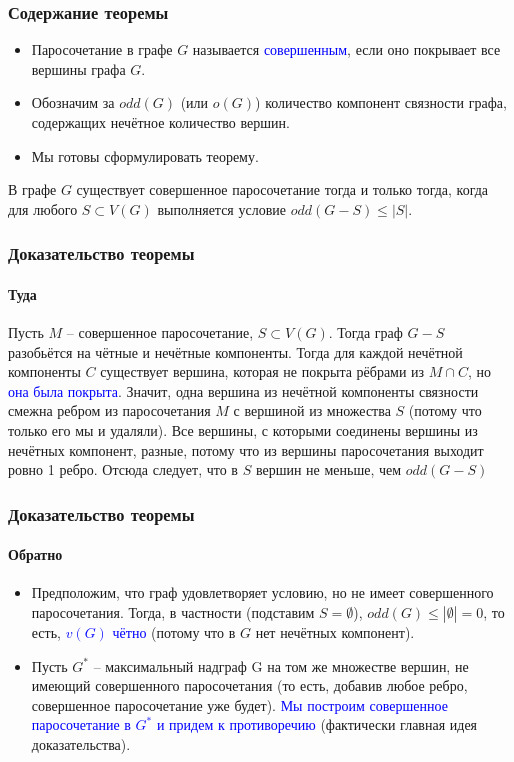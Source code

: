 
\begin{frame}[t]
    \frametitle{Содержание теоремы}
    \begin{itemize}
        \item Паросочетание в графе $G$ называется \textcolor{blue}{совершенным}, если оно покрывает все вершины графа $G$.
        \item Обозначим за $odd(G)$ (или  $o(G)$) количество компонент связности графа, содержащих нечётное количество вершин. 
        \item Мы готовы сформулировать теорему. 
    \end{itemize}

    \begin{theorem}[W. T. Tutte, 1947]
       В графе $G$ существует совершенное паросочетание тогда и только тогда, когда для любого $S \subset V(G)$ выполняется условие $odd(G-S) \leq \left| S \right| $.
    \end{theorem}
\end{frame}

\begin{frame}[t]
    \frametitle{Доказательство теоремы}
    \framesubtitle{Туда}
    \renewcommand{\qedsymbol}{}
        \fbox{$ \Rightarrow $} Пусть $M$ -- совершенное паросочетание, $S \subset V(G)$. Тогда граф $G - S$ разобьётся на чётные и нечётные компоненты. Тогда для каждой нечётной компоненты $C$ существует вершина, которая не покрыта рёбрами из $M \cap C$, но \textcolor{blue}{она была покрыта}. Значит, одна вершина из нечётной компоненты связности смежна ребром из паросочетания $M$ с вершиной из множества $S$ (потому что только его мы и удаляли). Все вершины, с которыми соединены вершины из нечётных компонент, разные, потому что из вершины паросочетания выходит ровно 1 ребро. Отсюда следует, что в $S$ вершин не меньше, чем $odd(G-S)$ 
\end{frame}


\begin{frame}[t]
    \frametitle{Доказательство теоремы}
    \framesubtitle{Обратно}
        \fbox{$ \Leftarrow $} \begin{itemize}
            \item Предположим, что граф удовлетворяет условию, но не имеет совершенного паросочетания. Тогда, в частности (подставим $S = \emptyset$), $odd(G) \leq |\emptyset| = 0$, то есть, \textcolor{blue}{$v(G)$ чётно} (потому что в $G$ нет нечётных компонент).
            \item Пусть $G^*$ -- максимальный надграф G на том же множестве вершин, не имеющий совершенного паросочетания (то есть, добавив любое ребро, совершенное паросочетание уже будет). \textcolor{blue}{Мы построим совершенное паросочетание в $G^*$ и придем к противоречию} (фактически главная идея доказательства).
        \end{itemize}
\end{frame}

